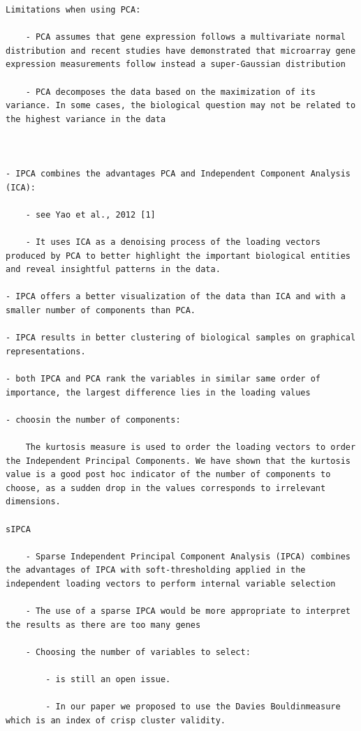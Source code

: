 \documentclass[
]{book}
\begin{document}
\begin{verbatim}
Limitations when using PCA:

    - PCA assumes that gene expression follows a multivariate normal distribution and recent studies have demonstrated that microarray gene expression measurements follow instead a super-Gaussian distribution

    - PCA decomposes the data based on the maximization of its variance. In some cases, the biological question may not be related to the highest variance in the data



- IPCA combines the advantages PCA and Independent Component Analysis (ICA):

    - see Yao et al., 2012 [1]

    - It uses ICA as a denoising process of the loading vectors produced by PCA to better highlight the important biological entities and reveal insightful patterns in the data.

- IPCA offers a better visualization of the data than ICA and with a smaller number of components than PCA.

- IPCA results in better clustering of biological samples on graphical representations.

- both IPCA and PCA rank the variables in similar same order of importance, the largest difference lies in the loading values

- choosin the number of components:

    The kurtosis measure is used to order the loading vectors to order the Independent Principal Components. We have shown that the kurtosis value is a good post hoc indicator of the number of components to choose, as a sudden drop in the values corresponds to irrelevant dimensions.

sIPCA

    - Sparse Independent Principal Component Analysis (IPCA) combines the advantages of IPCA with soft-thresholding applied in the independent loading vectors to perform internal variable selection

    - The use of a sparse IPCA would be more appropriate to interpret the results as there are too many genes

    - Choosing the number of variables to select:

        - is still an open issue.

        - In our paper we proposed to use the Davies Bouldinmeasure which is an index of crisp cluster validity.


\end{verbatim}
\end{document}
